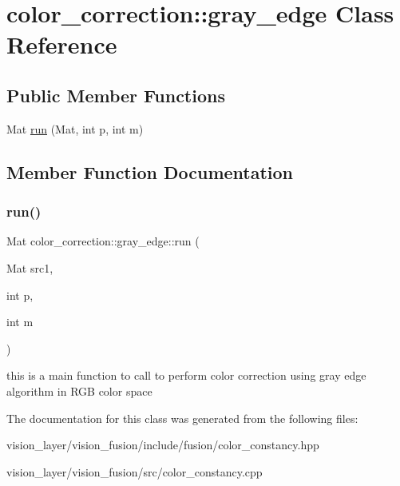 \hypertarget{classcolor__correction_1_1gray__edge}{}\section{color\+\_\+correction\+:\+:gray\+\_\+edge Class Reference}
\label{classcolor__correction_1_1gray__edge}
\subsection*{Public Member Functions}
\begin{DoxyCompactItemize}
\item 
Mat \hyperlink{classcolor__correction_1_1gray__edge_a7a8b5fbda7e19f8e48b1ba299e630c3c}{run} (Mat, int p, int m)
\end{DoxyCompactItemize}


\subsection{Member Function Documentation}
\mbox{\label{classcolor__correction_1_1gray__edge_a7a8b5fbda7e19f8e48b1ba299e630c3c}} 
\subsubsection{\texorpdfstring{run()}{run()}}
{\footnotesize\ttfamily Mat color\+\_\+correction\+::gray\+\_\+edge\+::run (\begin{DoxyParamCaption}\item[{Mat}]{src1,  }\item[{int}]{p,  }\item[{int}]{m }\end{DoxyParamCaption})}

this is a main function to call to perform color correction using gray edge algorithm in R\+GB color space 

The documentation for this class was generated from the following files\+:\begin{DoxyCompactItemize}
\item 
vision\+\_\+layer/vision\+\_\+fusion/include/fusion/color\+\_\+constancy.\+hpp\item 
vision\+\_\+layer/vision\+\_\+fusion/src/color\+\_\+constancy.\+cpp\end{DoxyCompactItemize}

